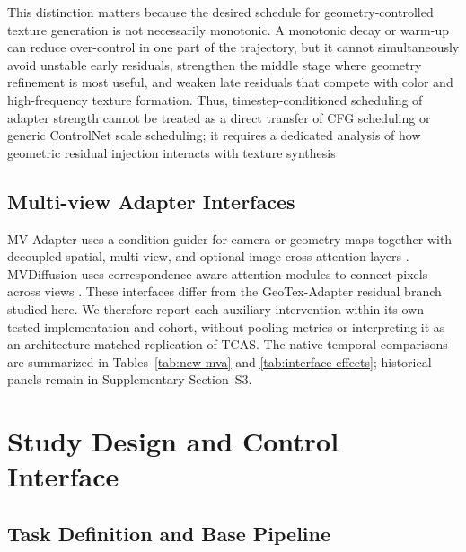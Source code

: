 \documentclass[times,twocolumn,final]{elsarticle}
\providecommand{\DIFadd}[1]{{\protect\color{blue} \sf #1}} %
\providecommand{\DIFdel}[1]{{\protect\color{red} \scriptsize #1}} %
\providecommand{\DIFaddbegin}{} %
\providecommand{\DIFaddend}{} %
\providecommand{\DIFdelbegin}{} %
\providecommand{\DIFdelend}{} %
\begin{document}
\DIFdelbegin \DIFdel{This distinction matters because the desired schedule for geometry-controlled texture generation is not necessarily monotonic. A monotonic decay or warm-up can reduce over-control in one part of the trajectory, but it cannot simultaneously avoid unstable early residuals, strengthen the middle stage where geometry refinement is most useful, and weaken late residuals that compete with color and high-frequency texture formation. Thus, timestep-conditioned scheduling of adapter strength cannot be treated as a direct transfer of CFG scheduling or generic ControlNet scale scheduling; it requires a dedicated analysis of how geometric residual injection interacts with texture synthesis}\DIFdelend \DIFaddbegin \subsection{Multi-view Adapter Interfaces}
\label{subsec:mvinterfaces}

\DIFadd{MV-Adapter uses a condition guider for camera or geometry maps together with decoupled spatial, multi-view, and optional image cross-attention layers \cite{huang2024mvadapter}. MVDiffusion uses correspondence-aware attention modules to connect pixels across views \cite{tang2023mvdiffusion}. These interfaces differ from the GeoTex-Adapter residual branch studied here. We therefore report each auxiliary intervention within its own tested implementation and cohort, without pooling metrics or interpreting it as an architecture-matched replication of TCAS. The native temporal comparisons are summarized in Tables~\ref{tab:new-mva} and \ref{tab:interface-effects}; historical panels remain in Supplementary Section~S3}\DIFaddend .

\DIFdelbegin %
\DIFdelend \DIFaddbegin \section{Study Design and Control Interface}
\DIFaddend \label{sec:method}

\subsection{Task Definition and Base Pipeline}
\label{subsec:task}
\end{document}
